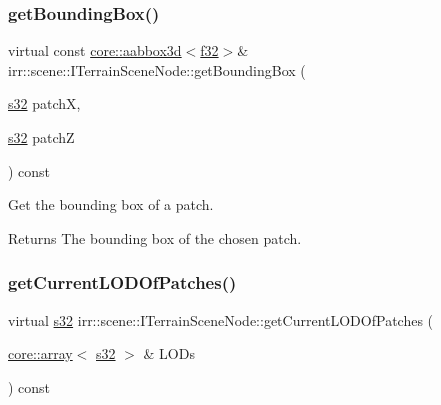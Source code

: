 \subsubsection{\texorpdfstring{get\+Bounding\+Box()}{getBoundingBox()}\hspace{0.1cm}{\footnotesize\ttfamily [4/4]}}
{\footnotesize\ttfamily virtual const \hyperlink{classirr_1_1core_1_1aabbox3d}{core\+::aabbox3d}$<$\hyperlink{namespaceirr_a0277be98d67dc26ff93b1a6a1d086b07}{f32}$>$\& irr\+::scene\+::\+I\+Terrain\+Scene\+Node\+::get\+Bounding\+Box (\begin{DoxyParamCaption}\item[{\hyperlink{namespaceirr_ac66849b7a6ed16e30ebede579f9b47c6}{s32}}]{patchX,  }\item[{\hyperlink{namespaceirr_ac66849b7a6ed16e30ebede579f9b47c6}{s32}}]{patchZ }\end{DoxyParamCaption}) const\hspace{0.3cm}{\ttfamily [pure virtual]}}



Get the bounding box of a patch. 

\begin{DoxyReturn}{Returns}
The bounding box of the chosen patch. 
\end{DoxyReturn}
\mbox{\label{classirr_1_1scene_1_1ITerrainSceneNode_a0d310851f0ebf1fce18d3a2c0f3dceab}} 
\subsubsection{\texorpdfstring{get\+Current\+L\+O\+D\+Of\+Patches()}{getCurrentLODOfPatches()}\hspace{0.1cm}{\footnotesize\ttfamily [1/2]}}
{\footnotesize\ttfamily virtual \hyperlink{namespaceirr_ac66849b7a6ed16e30ebede579f9b47c6}{s32} irr\+::scene\+::\+I\+Terrain\+Scene\+Node\+::get\+Current\+L\+O\+D\+Of\+Patches (\begin{DoxyParamCaption}\item[{\hyperlink{classirr_1_1core_1_1array}{core\+::array}$<$ \hyperlink{namespaceirr_ac66849b7a6ed16e30ebede579f9b47c6}{s32} $>$ \&}]{L\+O\+Ds }\end{DoxyParamCaption}) const\hspace{0.3cm}{\ttfamily [pure virtual]}}



